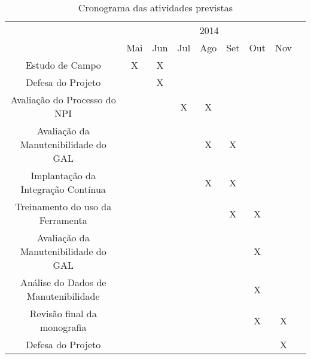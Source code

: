 \begin{table}[!htpb]
\centering
\caption{Cronograma das atividades previstas}

\begin{small} 
  
\setlength{\tabcolsep}{6pt} 


\begin{tabular}{|c|c|c|c|c|c|c|c|c}\hline
 & \multicolumn{7}{c|}{2014}\\ \cline{2-8}
\raisebox{1.5ex}{ATIVIDADES} & Mai & Jun & Jul & Ago & Set & Out & Nov \\ \hline

Estudo de Campo & X & X & & &  &  & \\ \hline
Defesa do Projeto &  & X & & &  &  & \\ \hline
Avaliação do Processo do NPI &  &  & X & X &  &  & \\ \hline
Avaliação da Manutenibilidade do GAL &  &  &  & X & X &  & \\ \hline
Implantação da Integração Contínua &  &  &  & X & X &  & \\ \hline
Treinamento do uso da Ferramenta &  &  &  & & X & X & \\ \hline
Avaliação da Manutenibilidade do GAL  &  &  &  &  &  & X & \\ \hline
Análise do Dados de Manutenibilidade &  &  &  & &  & X &  \\ \hline
Revisão final da monografia & & & & & & X & X \\ \hline
Defesa do Projeto & & & & & & & X \\ \hline

\end{tabular} 
\end{small}
\label{t_cronograma}
\end{table} 